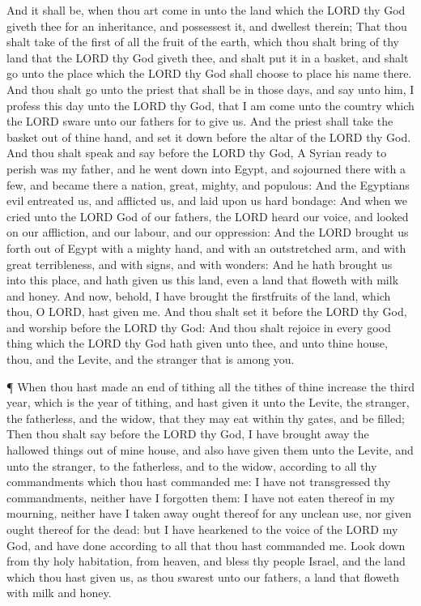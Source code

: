  And it shall be, when thou art come in unto the land which
the LORD thy God giveth thee for an inheritance, and possessest it, and
dwellest therein;  That thou shalt take of the first of all
the fruit of the earth, which thou shalt bring of thy land that the LORD
thy God giveth thee, and shalt put it in a basket, and shalt go unto the
place which the LORD thy God shall choose to place his name there.
 And thou shalt go unto the priest that shall be in those
days, and say unto him, I profess this day unto the LORD thy God, that I
am come unto the country which the LORD sware unto our fathers for to
give us.  And the priest shall take the basket out of thine
hand, and set it down before the altar of the LORD thy God. 
And thou shalt speak and say before the LORD thy God, A Syrian ready to
perish was my father, and he went down into Egypt, and sojourned there
with a few, and became there a nation, great, mighty, and populous:
 And the Egyptians evil entreated us, and afflicted us, and
laid upon us hard bondage:  And when we cried unto the LORD
God of our fathers, the LORD heard our voice, and looked on our
affliction, and our labour, and our oppression:  And the
LORD brought us forth out of Egypt with a mighty hand, and with an
outstretched arm, and with great terribleness, and with signs, and with
wonders:  And he hath brought us into this place, and hath
given us this land, even a land that floweth with milk and honey.
 And now, behold, I have brought the firstfruits of the
land, which thou, O LORD, hast given me. And thou shalt set it before
the LORD thy God, and worship before the LORD thy God:  And
thou shalt rejoice in every good thing which the LORD thy God hath given
unto thee, and unto thine house, thou, and the Levite, and the stranger
that is among you.

 ¶ When thou hast made an end of tithing all the tithes of
thine increase the third year, which is the year of tithing, and hast
given it unto the Levite, the stranger, the fatherless, and the widow,
that they may eat within thy gates, and be filled;  Then
thou shalt say before the LORD thy God, I have brought away the hallowed
things out of mine house, and also have given them unto the Levite, and
unto the stranger, to the fatherless, and to the widow, according to all
thy commandments which thou hast commanded me: I have not transgressed
thy commandments, neither have I forgotten them:  I have
not eaten thereof in my mourning, neither have I taken away ought
thereof for any unclean use, nor given ought thereof for the dead: but I
have hearkened to the voice of the LORD my God, and have done according
to all that thou hast commanded me.  Look down from thy
holy habitation, from heaven, and bless thy people Israel, and the land
which thou hast given us, as thou swarest unto our fathers, a land that
floweth with milk and honey.

